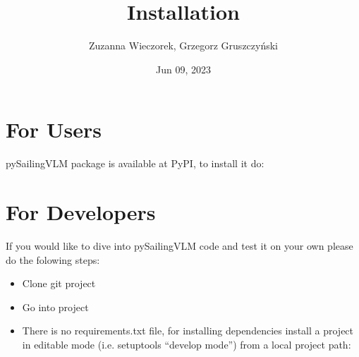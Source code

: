 \documentclass[a4paper,12pt,english]{jupyterBook}
\title{Installation}
\date{Jun 09, 2023}
\author{Zuzanna Wieczorek, Grzegorz Gruszczyński}
\begin{document}
\pagestyle{empty}
\sphinxmaketitle
\clearpage

\pagestyle{plain}
\sphinxtableofcontents
\pagestyle{normal}
\label{\detokenize{chapters/start/installation::doc}}



\part{For Users}
\label{\detokenize{chapters/start/installation:for-users}}
\sphinxAtStartPar
pySailingVLM package is available at PyPI, to install it do:

\begin{sphinxVerbatim}[commandchars=\\\{\}]
  
\end{sphinxVerbatim}


\part{For Developers}
\label{\detokenize{chapters/start/installation:for-developers}}
\sphinxAtStartPar
If you would like to dive into pySailingVLM code and test it on your own please do the folowing steps:
\begin{itemize}
\item {} 
\sphinxAtStartPar
Clone git project

\end{itemize}

\begin{sphinxVerbatim}[commandchars=\\\{\}]
  
\end{sphinxVerbatim}
\begin{itemize}
\item {} 
\sphinxAtStartPar
Go into project

\end{itemize}

\begin{sphinxVerbatim}[commandchars=\\\{\}]
 
\end{sphinxVerbatim}
\begin{itemize}
\item {} 
\sphinxAtStartPar
There is no requirements.txt file, for installing dependencies install a project in editable mode (i.e. setuptools “develop mode”) from a local project path:

\end{itemize}
\end{document}
